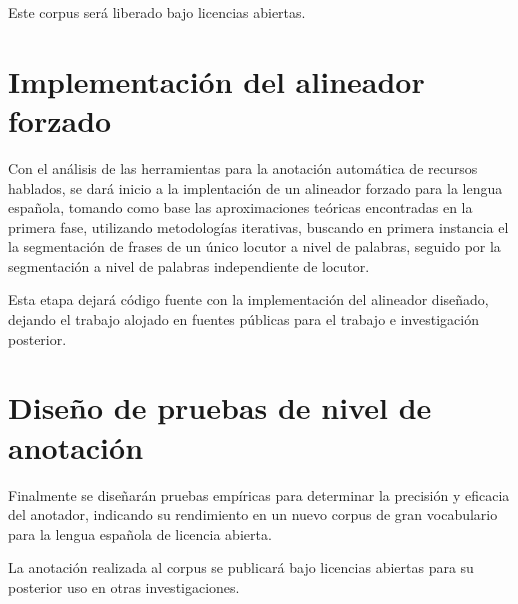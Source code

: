 Este corpus será liberado bajo licencias abiertas.

\section{Implementación del alineador forzado}
Con el análisis de las herramientas para la anotación automática de recursos hablados, se dará inicio a la implentación de un alineador forzado para la lengua española, tomando como base las aproximaciones teóricas encontradas en la primera fase, utilizando metodologías iterativas, buscando en primera instancia el la segmentación de frases de un único locutor a nivel de palabras, seguido por la segmentación a nivel de palabras independiente de locutor. 

Esta etapa dejará código fuente con la implementación del alineador diseñado, dejando el trabajo alojado en fuentes públicas para el trabajo e investigación posterior.


\section{Diseño de pruebas de nivel de anotación}
Finalmente se diseñarán pruebas empíricas para determinar la precisión y eficacia del anotador, indicando su rendimiento en un nuevo corpus de gran vocabulario para la lengua española de licencia abierta.

La anotación realizada al corpus se publicará bajo licencias abiertas para su posterior uso en otras investigaciones.